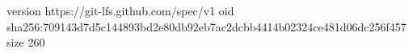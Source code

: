 version https://git-lfs.github.com/spec/v1
oid sha256:709143d7d5c144893bd2e80db92eb7ac2dcbb4414b02324ce481d06dc256f457
size 260
